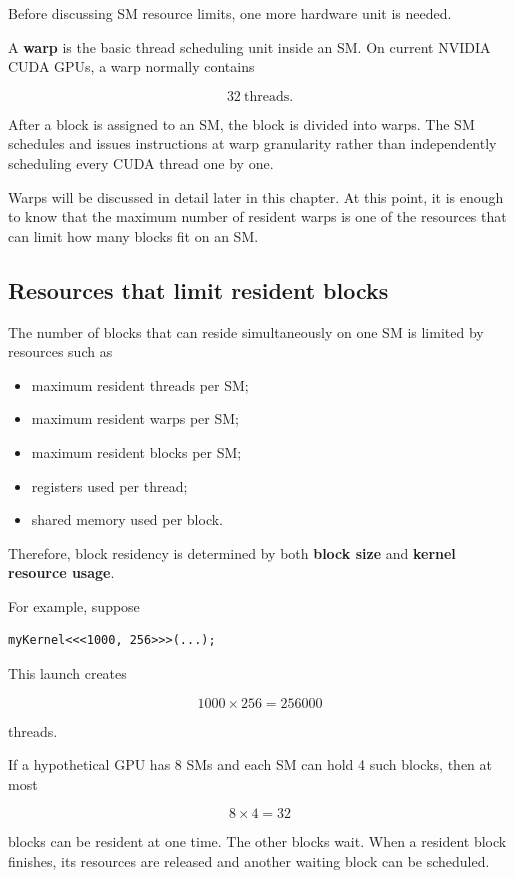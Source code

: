 \documentclass[11pt,a4paper]{article}
\begin{document}
Before discussing SM resource limits, one more hardware unit is needed.

A \textbf{warp} is the basic thread scheduling unit inside an SM. On current NVIDIA CUDA GPUs, a warp normally contains

\[
\boxed{32\ \text{threads}}.
\]

After a block is assigned to an SM, the block is divided into warps. The SM schedules and issues instructions at warp granularity rather than independently scheduling every CUDA thread one by one.

Warps will be discussed in detail later in this chapter. At this point, it is enough to know that the maximum number of resident warps is one of the resources that can limit how many blocks fit on an SM.

\subsection{Resources that limit resident blocks}

The number of blocks that can reside simultaneously on one SM is limited by resources such as

\begin{itemize}
    \item maximum resident threads per SM;
    \item maximum resident warps per SM;
    \item maximum resident blocks per SM;
    \item registers used per thread;
    \item shared memory used per block.
\end{itemize}

Therefore, block residency is determined by both \textbf{block size} and \textbf{kernel resource usage}.

For example, suppose

\begin{lstlisting}
myKernel<<<1000, 256>>>(...);
\end{lstlisting}

This launch creates

\[
1000 \times 256 = 256000
\]

threads.

If a hypothetical GPU has 8 SMs and each SM can hold 4 such blocks, then at most

\[
8 \times 4 = 32
\]

blocks can be resident at one time. The other blocks wait. When a resident block finishes, its resources are released and another waiting block can be scheduled.
\end{document}
